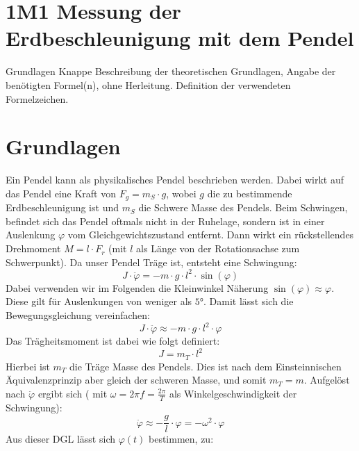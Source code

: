\documentclass[twoside]{protokoll}
\begin{document}
 
\section{1M1 Messung der Erdbeschleunigung mit dem Pendel}
 
\begin{aufgabe}{Grundlagen}
  Knappe Beschreibung der theoretischen Grundlagen, Angabe der
  benötigten Formel(n), ohne Herleitung. Definition der verwendeten
  Formelzeichen.
\end{aufgabe}

\section{Grundlagen}

Ein Pendel kann als physikalisches Pendel beschrieben werden.
Dabei wirkt auf das Pendel eine Kraft von $F_g = m_S \cdot g$, wobei $g$ die zu bestimmende Erdbeschleunigung ist und $m_S$ die Schwere Masse des Pendels.
Beim Schwingen, befindet sich das Pendel oftmals nicht in der Ruhelage, sondern ist in einer Auslenkung $\varphi$ vom Gleichgewichtszustand entfernt.
Dann wirkt ein rückstellendes Drehmoment $ M = l \cdot F_r$ (mit $l$ als Länge von der Rotationsachse zum Schwerpunkt).
Da unser Pendel Träge ist, entsteht eine Schwingung: 
\begin{equation}
    J \cdot \ddot{\varphi} = -m \cdot g \cdot l^2 \cdot \sin(\varphi)
\end{equation}
Dabei verwenden wir im Folgenden die Kleinwinkel Näherung $\sin(\varphi) \approx \varphi$.
Diese gilt für Auslenkungen von weniger als $5$°. Damit lässt sich die Bewegungsgleichung vereinfachen:
\begin{equation}
    J \cdot \ddot{\varphi} \approx -m \cdot g \cdot l^2 \cdot \varphi
\end{equation}
Das Trägheitsmoment ist dabei wie folgt definiert:
\begin{equation}
    J =  m_T \cdot l^2
\end{equation}
Hierbei ist $m_T$ die Träge Masse des Pendels. Dies ist nach dem Einsteinnischen Äquivalenzprinzip aber gleich der schweren Masse, und somit $m_T = m$.
Aufgelöst nach $\ddot{\varphi}$ ergibt sich ( mit $\omega = 2 \pi f = \frac{2 \pi}{T}$ als Winkelgeschwindigkeit der Schwingung):
\begin{equation}
    \ddot{\varphi} \approx -\frac{g}{l} \cdot \varphi = - \omega^2 \cdot \varphi
\end{equation}
Aus dieser DGL lässt sich $\varphi(t)$ bestimmen, zu:
\end{document}
